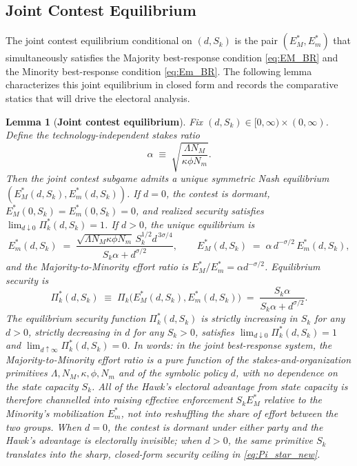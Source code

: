 \documentclass[11pt,twoside]{extarticle}
\newtheorem{lemma}{Lemma}
\begin{document}
\subsection{Joint Contest Equilibrium}\label{subsec:joint_contest}

The joint contest equilibrium conditional on $(d,S_k)$ is the pair $(E_M^*,E_m^*)$ that simultaneously satisfies the Majority best-response condition \autoref{eq:EM_BR} and the Minority best-response condition \autoref{eq:Em_BR}. The following lemma characterizes this joint equilibrium in closed form and records the comparative statics that will drive the electoral analysis.

\begin{lemma}[\textbf{Joint contest equilibrium}] \label{lem:contest_equilibrium}
Fix $(d,S_k)\in[0,\infty)\times(0,\infty)$. Define the technology-independent \emph{stakes ratio}
\begin{equation}\label{eq:alpha_def}
\alpha \;\equiv\; \sqrt{\frac{\Lambda N_M}{\kappa \phi N_m}}.
\end{equation}
Then the joint contest subgame admits a unique symmetric Nash equilibrium $(E_M^*(d,S_k),E_m^*(d,S_k))$. If $d=0$, the contest is dormant, $E_M^*(0,S_k)=E_m^*(0,S_k)=0$, and realized security satisfies $\lim_{d\downarrow 0}\Pi_k^*(d,S_k)=1$. If $d>0$, the unique equilibrium is
\begin{equation}\label{eq:EmEM_star}
E_m^*(d,S_k) \;=\; \frac{\sqrt{\Lambda N_M \kappa\phi N_m}\, S_k^{1/2} d^{\,3\sigma/4}}{S_k\alpha+d^{\sigma/2}},
\qquad
E_M^*(d,S_k) \;=\; \alpha\, d^{-\sigma/2}\, E_m^*(d,S_k),
\end{equation}
and the Majority-to-Minority effort ratio is $E_M^*/E_m^*=\alpha d^{-\sigma/2}$. Equilibrium security is
\begin{equation} \label{eq:Pi_star_new}
\Pi_k^*(d,S_k) \;\equiv\; \Pi_k\bigl(E_M^*(d,S_k),E_m^*(d,S_k)\bigr) \;=\; \frac{S_k\alpha}{S_k\alpha + d^{\sigma/2}}.
\end{equation}
The equilibrium security function $\Pi_k^*(d,S_k)$ is strictly increasing in $S_k$ for any $d>0$, strictly decreasing in $d$ for any $S_k>0$, satisfies $\lim_{d\downarrow 0}\Pi_k^*(d,S_k)=1$ and $\lim_{d\uparrow\infty}\Pi_k^*(d,S_k)=0$.
In words: in the joint best-response system, the Majority-to-Minority effort ratio is a pure function of the stakes-and-organization primitives $\Lambda, N_M,\kappa,\phi, N_m$ and of the symbolic policy $d$, with \emph{no} dependence on the state capacity $S_k$. All of the Hawk's electoral advantage from state capacity is therefore channelled into raising effective enforcement $S_k E_M^*$ relative to the Minority's mobilization $E_m^*$, not into reshuffling the share of effort between the two groups. When $d=0$, the contest is dormant under either party and the Hawk's advantage is electorally invisible; when $d>0$, the same primitive $S_k$ translates into the sharp, closed-form security ceiling in \autoref{eq:Pi_star_new}.
\end{lemma}
\end{document}
